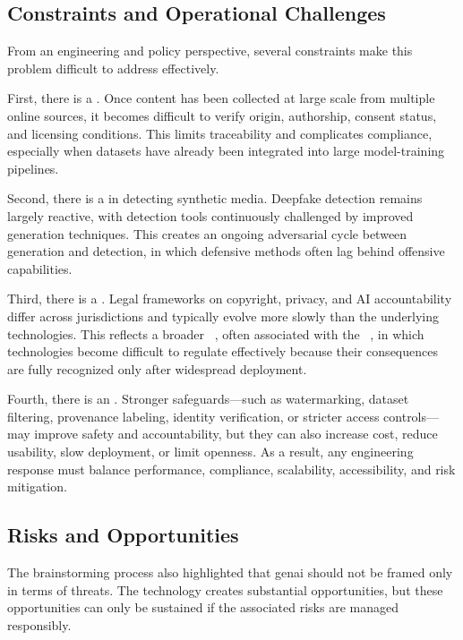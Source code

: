 \subsection{Constraints and Operational Challenges}\label{sec:constraints}
From an engineering and policy perspective, several constraints make this problem difficult to address effectively.

First, there is a . Once content has been collected at large scale from multiple online sources, it becomes difficult to verify origin, authorship, consent status, and licensing conditions. This limits traceability and complicates compliance, especially when datasets have already been integrated into large model-training pipelines.

Second, there is a  in detecting synthetic media. Deepfake detection remains largely reactive, with detection tools continuously challenged by improved generation techniques. This creates an ongoing adversarial cycle between generation and detection, in which defensive methods often lag behind offensive capabilities.

Third, there is a . Legal frameworks on copyright, privacy, and AI accountability differ across jurisdictions and typically evolve more slowly than the underlying technologies. This reflects a broader ~\cite{pacing-problem}, often associated with the ~\cite{collingridge}, in which technologies become difficult to regulate effectively because their consequences are fully recognized only after widespread deployment.

Fourth, there is an . Stronger safeguards---such as watermarking, dataset filtering, provenance labeling, identity verification, or stricter access controls---may improve safety and accountability, but they can also increase cost, reduce usability, slow deployment, or limit openness. As a result, any engineering response must balance performance, compliance, scalability, accessibility, and risk mitigation.

\subsection{Risks and Opportunities}\label{sec:risks-opportunities}
The brainstorming process also highlighted that \ac{genai} should not be framed only in terms of threats. The technology creates substantial opportunities, but these opportunities can only be sustained if the associated risks are managed responsibly.

